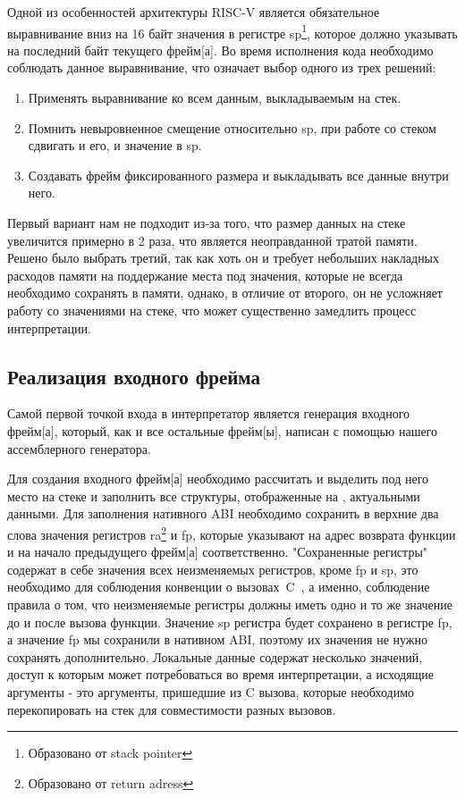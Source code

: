     Одной из особенностей архитектуры RISC-V является обязательное выравнивание вниз на 16 байт значения в регистре sp\footnote{Образовано от stack pointer}, которое должно указывать на последний байт текущего \gls{фрейм}[а]. Во время исполнения кода необходимо соблюдать данное выравнивание, что означает выбор одного из трех решений:
\begin{enumerate}
    \item Применять выравнивание ко всем данным, выкладываемым на стек.
    \item Помнить невыровненное смещение относительно sp, при работе со стеком сдвигать и его, и значение в sp.
    \item Создавать \gls{фрейм} фиксированного размера и выкладывать все данные внутри него.
\end{enumerate}

Первый вариант нам не подходит из-за того, что размер данных на стеке увеличится примерно в 2 раза, что является неоправданной тратой памяти. Решено было выбрать третий, так как хоть он и требует небольших накладных расходов памяти на поддержание места под значения, которые не всегда необходимо сохранять в памяти, однако, в отличие от второго, он не усложняет работу со значениями на стеке, что может существенно замедлить процесс интерпретации.

\subsection{Реализация входного фрейма}

Самой первой точкой входа в интерпретатор является генерация входного \gls{фрейм}[а], который, как и все остальные \gls{фрейм}[ы], написан с помощью нашего ассемблерного генератора. 

Для создания входного \gls{фрейм}[а] необходимо рассчитать и выделить под него место на стеке и заполнить все структуры, отображенные на , актуальными данными. Для заполнения нативного ABI необходимо сохранить в верхние два слова значения регистров ra\footnote{Образовано от return adress} и fp, которые указывают на адрес возврата функции и на начало предыдущего \gls{фрейм}[а] соответственно. "Сохраненные регистры" содержат в себе значения всех неизменяемых регистров, кроме fp и sp, это необходимо для соблюдения конвенции о вызовах~C~\cite{riscv:convention}, а именно, соблюдение правила о том, что неизменяемые регистры должны иметь одно и то же значение до и после вызова функции. Значение sp регистра будет сохранено в регистре fp, а значение fp мы сохранили в нативном ABI, поэтому их значения не нужно сохранять дополнительно. Локальные данные содержат несколько значений, доступ к которым может потребоваться во время интерпретации, а исходящие аргументы - это аргументы, пришедшие из C вызова, которые необходимо перекопировать на стек для совместимости разных вызовов.
 
